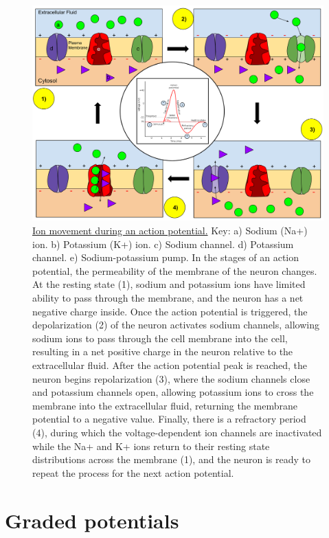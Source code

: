 \begin{figure}

{\centering \includegraphics[width=0.7\linewidth]{./figures/potential/ActionPotential} 

}

\caption{\href{https://commons.wikimedia.org/wiki/File:Membrane_Permeability_of_a_Neuron_During_an_Action_Potential.svg}{Ion movement during an action potential.} Key: a) Sodium (Na+) ion. b) Potassium (K+) ion. c) Sodium channel. d) Potassium channel. e) Sodium-potassium pump. In the stages of an action potential, the permeability of the membrane of the neuron changes. At the resting state (1), sodium and potassium ions have limited ability to pass through the membrane, and the neuron has a net negative charge inside. Once the action potential is triggered, the depolarization (2) of the neuron activates sodium channels, allowing sodium ions to pass through the cell membrane into the cell, resulting in a net positive charge in the neuron relative to the extracellular fluid. After the action potential peak is reached, the neuron begins repolarization (3), where the sodium channels close and potassium channels open, allowing potassium ions to cross the membrane into the extracellular fluid, returning the membrane potential to a negative value. Finally, there is a refractory period (4), during which the voltage-dependent ion channels are inactivated while the Na+ and K+ ions return to their resting state distributions across the membrane (1), and the neuron is ready to repeat the process for the next action potential.}\label{fig:actionpotential}
\end{figure}

\hypertarget{graded-potentials}{%
\section{Graded potentials}\label{graded-potentials}}

